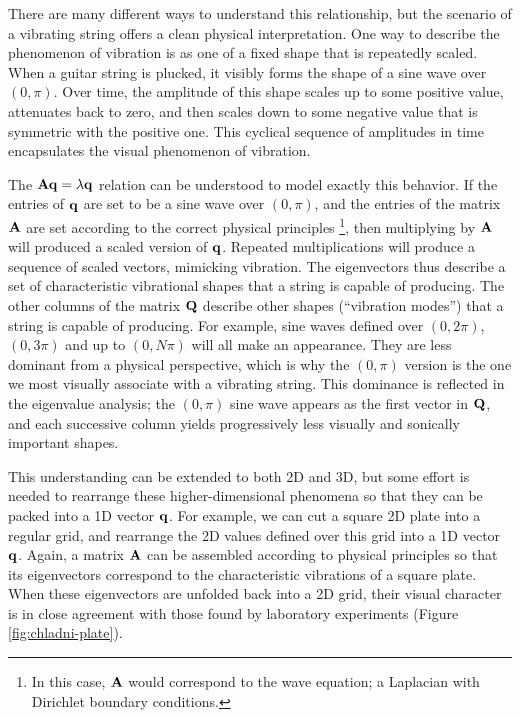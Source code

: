 \documentclass[11pt]{article}
\begin{document}
There are many different ways to understand this relationship, but the scenario of a vibrating string offers a clean physical interpretation. One way to describe the phenomenon of vibration is as one of a fixed shape that is repeatedly scaled. When a guitar string is plucked, it visibly forms the shape of a sine wave over $(0, \pi)$. Over time, the amplitude of this shape scales up to some positive value, attenuates back to zero, and then scales down to some negative value that is symmetric with the positive one. This cyclical sequence of amplitudes in time encapsulates the visual phenomenon of vibration.

The $\mathbf{A} \mathbf{q} = \lambda \mathbf{q}$ relation can be understood to model exactly this behavior. If the entries of $\mathbf{q}$ are set to be a sine wave over $(0, \pi)$, and the entries of the matrix $\mathbf{A}$ are set according to the correct physical principles \footnote{In this case, $\mathbf{A}$ would correspond to the wave equation; a Laplacian with Dirichlet boundary conditions.}, then multiplying by $\mathbf{A}$ will produced a scaled version of $\mathbf{q}$. Repeated multiplications will produce a sequence of scaled vectors, mimicking vibration. The eigenvectors thus describe a set of characteristic vibrational shapes that a string is capable of producing. The other columns of the matrix $\mathbf{Q}$ describe other shapes (``vibration modes'') that a string is capable of producing. For example, sine waves defined over $(0, 2\pi)$, $(0, 3\pi)$ and up to $(0, N \pi)$ will all make an appearance. They are less dominant from a physical perspective, which is why the $(0, \pi)$ version is the one we most visually associate with a vibrating string. This dominance is reflected in the eigenvalue analysis; the $(0, \pi)$ sine wave appears as the first vector in $\mathbf{Q}$, and each successive column yields progressively less visually and sonically important shapes.

This understanding can be extended to both 2D and 3D, but some effort is needed to rearrange these higher-dimensional phenomena so that they can be packed into a 1D vector $\mathbf{q}$. For example, we can cut a square 2D plate into a regular grid, and rearrange the 2D values defined over this grid into a 1D vector $\mathbf{q}$. Again, a matrix $\mathbf{A}$ can be assembled according to physical principles so that its eigenvectors correspond to the characteristic vibrations of a square plate. When these eigenvectors are unfolded back into a 2D grid, their visual character is in close agreement with those found by laboratory experiments (Figure \ref{fig:chladni-plate}).
\end{document}
